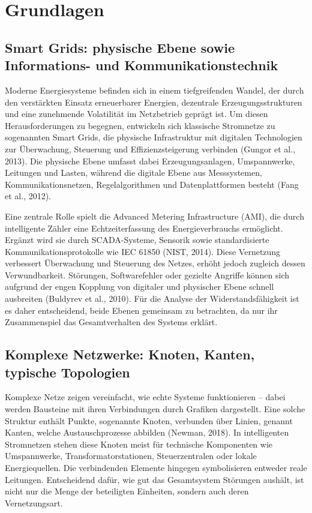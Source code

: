 \section{Grundlagen}
\subsection{Smart Grids: physische Ebene sowie Informations- und Kommunikationstechnik}
Moderne Energiesysteme befinden sich in einem tiefgreifenden Wandel, der durch den verstärkten Einsatz erneuerbarer Energien, dezentrale Erzeugungsstrukturen und eine zunehmende Volatilität im Netzbetrieb geprägt ist. Um diesen Herausforderungen zu begegnen, entwickeln sich klassische Stromnetze zu sogenannten Smart Grids, die physische Infrastruktur mit digitalen Technologien zur Überwachung, Steuerung und Effizienzsteigerung verbinden (Gungor et al., 2013). Die physische Ebene umfasst dabei Erzeugungsanlagen, Umspannwerke, Leitungen und Lasten, während die digitale Ebene aus Messsystemen, Kommunikationsnetzen, Regelalgorithmen und Datenplattformen besteht (Fang et al., 2012).

Eine zentrale Rolle spielt die Advanced Metering Infrastructure (AMI), die durch intelligente Zähler eine Echtzeiterfassung des Energieverbrauchs ermöglicht. Ergänzt wird sie durch SCADA-Systeme, Sensorik sowie standardisierte Kommunikationsprotokolle wie IEC 61850 (NIST, 2014). Diese Vernetzung verbessert Überwachung und Steuerung des Netzes, erhöht jedoch zugleich dessen Verwundbarkeit. Störungen, Softwarefehler oder gezielte Angriffe können sich aufgrund der engen Kopplung von digitaler und physischer Ebene schnell ausbreiten (Buldyrev et al., 2010). Für die Analyse der Widerstandsfähigkeit ist es daher entscheidend, beide Ebenen gemeinsam zu betrachten, da nur ihr Zusammenspiel das Gesamtverhalten des Systems erklärt.

 
\subsection{Komplexe Netzwerke: Knoten, Kanten, typische Topologien}
Komplexe Netze zeigen vereinfacht, wie echte Systeme funktionieren – dabei werden Bausteine mit ihren Verbindungen durch Grafiken dargestellt. Eine solche Struktur enthält Punkte, sogenannte Knoten, verbunden über Linien, genannt Kanten, welche Austauschprozesse abbilden (Newman, 2018). In intelligenten Stromnetzen stehen diese Knoten meist für technische Komponenten wie Umspannwerke, Transformatorstationen, Steuerzentralen oder lokale Energiequellen. Die verbindenden Elemente hingegen symbolisieren entweder reale Leitungen. Entscheidend dafür, wie gut das Gesamtsystem Störungen aushält, ist nicht nur die Menge der beteiligten Einheiten, sondern auch deren Vernetzungsart.
